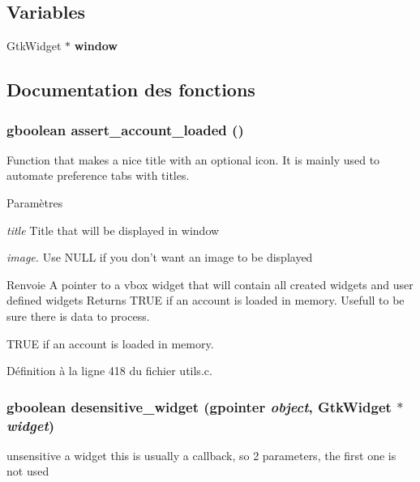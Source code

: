 \subsection*{Variables}
\begin{DoxyCompactItemize}
\item 
GtkWidget $\ast$ {\bf window}
\end{DoxyCompactItemize}


\subsection{Documentation des fonctions}
\subsubsection[{assert\_\-account\_\-loaded}]{\setlength{\rightskip}{0pt plus 5cm}gboolean assert\_\-account\_\-loaded ()}\label{utils_8c_a201366e3a41e970cd3009d8b5d7afdd0}
Function that makes a nice title with an optional icon. It is mainly used to automate preference tabs with titles.


\begin{DoxyParams}{Paramètres}
\item[{\em title}]Title that will be displayed in window \item[{\em image.}]Use NULL if you don't want an image to be displayed\end{DoxyParams}
\begin{DoxyReturn}{Renvoie}
A pointer to a vbox widget that will contain all created widgets and user defined widgets Returns TRUE if an account is loaded in memory. Usefull to be sure there is data to process.

TRUE if an account is loaded in memory. 
\end{DoxyReturn}


Définition à la ligne 418 du fichier utils.c.

\subsubsection[{desensitive\_\-widget}]{\setlength{\rightskip}{0pt plus 5cm}gboolean desensitive\_\-widget (gpointer {\em object}, \/  GtkWidget $\ast$ {\em widget})}\label{utils_8c_a2c94bcb7fbf8bc4dc28ae7ab24425a62}
unsensitive a widget this is usually a callback, so 2 parameters, the first one is not used


